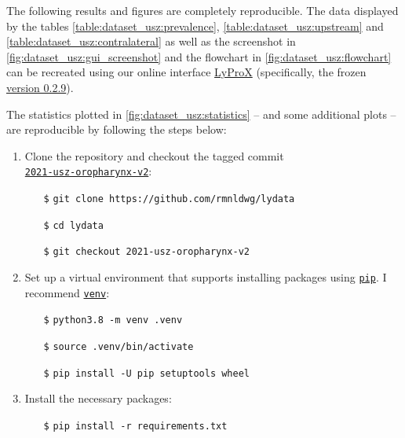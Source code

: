 \begin{tcolorbox}[title=\faIcon{recycle} Reproducibility, parbox=false]
    The following results and figures are completely reproducible. The data displayed by the tables \cref{table:dataset_usz:prevalence}, \cref{table:dataset_usz:upstream} and \cref{table:dataset_usz:contralateral} as well as the screenshot in \cref{fig:dataset_usz:gui_screenshot} and the flowchart in \cref{fig:dataset_usz:flowchart} can be recreated using our online interface \href{https://lyprox.org}{ LyProX} (specifically, the frozen \href{https://2021-oropharynx.lyprox.org}{ version 0.2.9}).
    
    The statistics plotted in \cref{fig:dataset_usz:statistics} -- and some additional plots -- are reproducible by following the steps below:

    \begin{enumerate}
        \item Clone the  repository and checkout the tagged commit \\
        \href{https://github.com/rmnldwg/lydata/tree/2021-usz-oropharynx-v2}{ \texttt{2021-usz-oropharynx-v2}}:
        \begin{itemize}[leftmargin=10mm]
            \setlength\itemsep{-0.5em}
            \item[\texttt{\$}] \verb|git clone https://github.com/rmnldwg/lydata|
            \item[\texttt{\$}] \verb|cd lydata|
            \item[\texttt{\$}] \verb|git checkout 2021-usz-oropharynx-v2|
        \end{itemize}

        \item Set up a virtual environment that supports installing packages using \href{https://pypi.org/project/pip/}{\texttt{pip}}. I recommend \href{https://docs.python.org/3/library/venv.html}{\texttt{venv}}:
        \begin{itemize}[leftmargin=10mm]
            \setlength\itemsep{-0.5em}
            \item[\texttt{\$}] \verb|python3.8 -m venv .venv|
            \item[\texttt{\$}] \verb|source .venv/bin/activate|
            \item[\texttt{\$}] \verb|pip install -U pip setuptools wheel|
        \end{itemize}

        \item Install the necessary packages:
        \begin{itemize}[leftmargin=10mm]
            \setlength\itemsep{-0.5em}
            \item[\texttt{\$}] \verb|pip install -r requirements.txt|
        \end{itemize}


\end{enumerate}
\end{tcolorbox}
